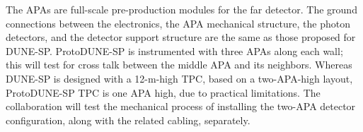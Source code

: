 The APAs are full-scale pre-production modules for the far detector.  The ground connections between the electronics, the APA mechanical structure, the photon detectors, and the detector support structure are the same as those proposed for DUNE-SP. ProtoDUNE-SP is instrumented with three APAs along each wall; this will test for cross talk between the middle APA and its neighbors. Whereas DUNE-SP is designed with a 12-m-high TPC, based on a two-APA-high layout, ProtoDUNE-SP TPC is one APA high, due to practical limitations. The collaboration will test the mechanical process of installing the two-APA detector configuration, along with the related cabling, separately.


